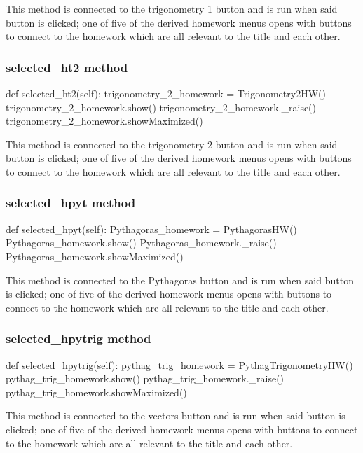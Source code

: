 This method is connected to the trigonometry 1 button and is run when said button is clicked; one of five of the derived homework menus opens with buttons to connect to the homework which are all relevant to the title and each other.

\subsubsection{selected\_ht2 method}

\begin{python}
def selected_ht2(self):
        trigonometry_2_homework = Trigonometry2HW()
        trigonometry_2_homework.show()
        trigonometry_2_homework._raise()
        trigonometry_2_homework.showMaximized()
\end{python}

This method is connected to the trigonometry 2 button and is run when said button is clicked; one of five of the derived homework menus opens with buttons to connect to the homework which are all relevant to the title and each other.

\subsubsection{selected\_hpyt method}

\begin{python}
def selected_hpyt(self):
        Pythagoras_homework = PythagorasHW()
        Pythagoras_homework.show()
        Pythagoras_homework._raise()
        Pythagoras_homework.showMaximized()
\end{python}

This method is connected to the Pythagoras button and is run when said button is clicked; one of five of the derived homework menus opens with buttons to connect to the homework which are all relevant to the title and each other.

\subsubsection{selected\_hpytrig method}

\begin{python}
def selected_hpytrig(self):
        pythag_trig_homework = PythagTrigonometryHW()
        pythag_trig_homework.show()
        pythag_trig_homework._raise()
        pythag_trig_homework.showMaximized()
\end{python}

This method is connected to the vectors button and is run when said button is clicked; one of five of the derived homework menus opens with buttons to connect to the homework which are all relevant to the title and each other.

